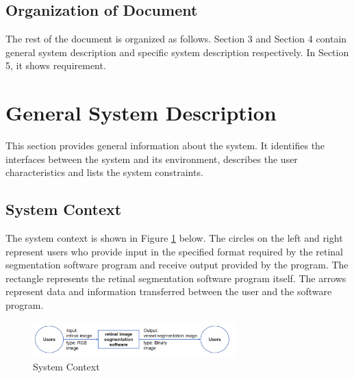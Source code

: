 \documentclass[12pt]{article}
\begin{document}
\subsection{Organization of Document}
The rest of the document is organized as follows. Section 3 and Section 4 contain general system description and specific system description respectively. In Section 5, it shows requirement.  


\section{General System Description}

This section provides general information about the system. It identifies the interfaces between the system and its environment, describes the user characteristics and lists the system constraints.

\subsection{System Context}

The system context is shown in Figure \ref{Fig_SystemContext} below. The circles on the left and right represent users who provide input in the specified format required by the retinal segmentation software program and receive output provided by the program. The rectangle represents the retinal segmentation software program itself. The arrows represent data and information transferred between the user and the software program.
\begin{figure}[h!]
\begin{center}
\includegraphics[width=0.7\textwidth]{System Context}
\caption{System Context}
\label{Fig_SystemContext} 
\end{center}
\end{figure}
\end{document}
